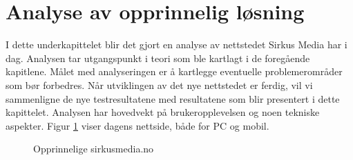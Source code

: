 \section{Analyse av opprinnelig løsning}

I dette underkapittelet blir det gjort en analyse av nettstedet Sirkus Media har i dag. Analysen tar utgangspunkt i teori som ble kartlagt i de foregående kapitlene. Målet med analyseringen er å kartlegge eventuelle problemerområder som bør forbedres. Når utviklingen av det nye nettstedet er ferdig, vil vi sammenligne de nye testresultatene med resultatene som blir presentert i dette kapittelet. Analysen har hovedvekt på brukeropplevelsen og noen tekniske aspekter.
Figur \ref{fig:analysis-current-sirkusmedia.no} viser dagens nettside, både for PC og mobil.

\begin{figure}[H]
    \begin{center}
        \label{fig:analysis-current-sirkusmedia.no}
        \caption{Opprinnelige sirkusmedia.no}
    \end{center}
\end{figure}

